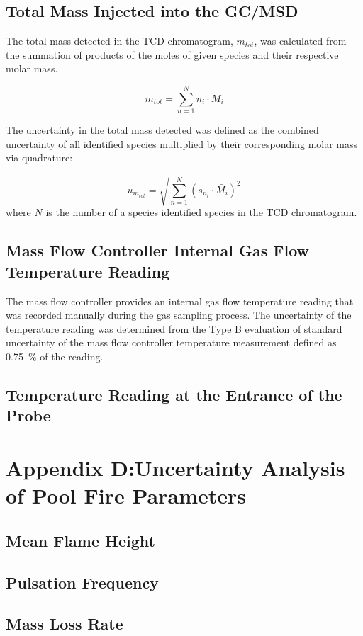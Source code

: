 \documentclass[12pt]{article}
\begin{document}
\subsection{Total Mass Injected into the GC/MSD}
\label{ssec:Total_Mass_Injected_into_GC/MSD}
The total mass detected in the TCD chromatogram, $m_{tot}$, was calculated from the summation of products of the moles of given species and their respective molar mass.

\begin{equation}
\label{eq:total_mass_detected_uncertainty}
m_{tot}=\sum_{n=1}^{N}  n_{i}\cdot\bar{M_{i}}
\end{equation}

The uncertainty in the total mass detected was defined as the combined uncertainty of all identified species multiplied by their corresponding molar mass via quadrature:

\begin{equation}
\label{eq:total_mass_detected_uncertainty}
u_{\scriptscriptstyle m_{tot}}=\sqrt{{\sum_{n=1}^{N} (s_{\scriptscriptstyle n_{i}}\cdot\bar{M_{i}})^2}}
\end{equation}
where $N$ is the number of a species identified species in the TCD chromatogram.

\subsection{Mass Flow Controller Internal Gas Flow Temperature Reading}
\label{ssec:MFC_Temp}

The mass flow controller provides an internal gas flow temperature reading that was recorded manually during the gas sampling process. The uncertainty of the temperature reading was determined from the Type B evaluation of standard uncertainty of the mass flow controller temperature measurement defined as 0.75~\% of the reading.

\subsection{Temperature Reading at the Entrance of the Probe}
\label{ssec:Probe_Temp}

\pagebreak

\section{Appendix D:Uncertainty Analysis of Pool Fire Parameters}\label{sec:Uncertainty_Pool_Fire_Parameters}

\subsection{Mean Flame Height}
\label{ssec:Mean_Flame_Height}

\subsection{Pulsation Frequency}
\label{ssec:Pulsation_Frequency}

\subsection{Mass Loss Rate}
\label{ssec:Mass_Loss_Rate}

\pagebreak
\end{document}
